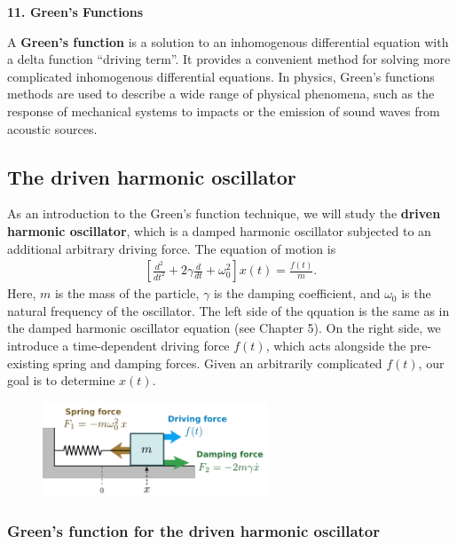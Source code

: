 \documentclass[10pt,a4paper]{article}
\begin{document}
\setcounter{page}{91}

\noindent
{\Large \textbf{11. Green's Functions}}
\vskip 0.2in

\label{greens-functions}

A \textbf{Green's function} is a solution to an inhomogenous
differential equation with a delta function ``driving term''.  It
provides a convenient method for solving more complicated inhomogenous
differential equations.  In physics, Green's functions methods are
used to describe a wide range of physical phenomena, such as the
response of mechanical systems to impacts or the emission of sound
waves from acoustic sources.

\subsection{The driven harmonic oscillator}
\label{the-driven-harmonic-oscillator}

As an introduction to the Green's function technique, we will study
the \textbf{driven harmonic oscillator}, which is a damped harmonic
oscillator subjected to an additional arbitrary driving force.  The
equation of motion is
\begin{align}
  \left[\frac{d^2}{dt^2} + 2 \gamma \frac{d}{dt} + \omega_0^2\right] x(t) = \frac{f(t)}{m}.
\end{align}
Here, $m$ is the mass of the particle, $\gamma$ is the damping
coefficient, and $\omega_0$ is the natural frequency of the
oscillator. The left side of the qquation is the same as in the damped
harmonic oscillator equation (see Chapter 5). On the right side, we
introduce a time-dependent driving force $f(t)$, which acts alongside
the pre-existing spring and damping forces. Given an arbitrarily
complicated $f(t)$, our goal is to determine $x(t)$.

\begin{figure}[ht]
  \centering\includegraphics[width=0.6\textwidth]{oscillator_driven}
\end{figure}

\subsubsection{Green's function for the driven harmonic oscillator}
\label{greens-function-for-the-driven-harmonic-oscillator}
\end{document}
